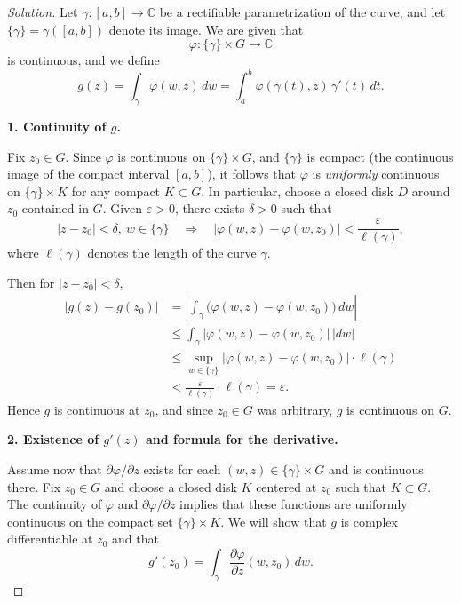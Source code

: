 \documentclass[12pt, a4paper]{report}
\theoremstyle{spaced}
\begin{document}
\begin{proof}[Solution]
	Let $\gamma : [a,b] \to \mathbb{C}$ be a rectifiable parametrization of the curve,
	and let $\{\gamma\} = \gamma([a,b])$ denote its image.
	We are given that
	\[
		\varphi : \{\gamma\} \times G \to \mathbb{C}
	\]
	is continuous, and we define
	\[
		g(z) = \int_{\gamma} \varphi(w,z)\,dw
		= \int_a^b \varphi(\gamma(t),z)\,\gamma'(t)\,dt.
	\]

	\medskip
	\noindent\textbf{1. Continuity of $g$.}

	Fix $z_0 \in G$.
	Since $\varphi$ is continuous on $\{\gamma\}\times G$, and $\{\gamma\}$ is compact
	(the continuous image of the compact interval $[a,b]$),
	it follows that $\varphi$ is \emph{uniformly} continuous on
	$\{\gamma\}\times K$ for any compact $K\subset G$.
	In particular, choose a closed disk $D$ around $z_0$ contained in $G$.
	Given $\varepsilon>0$, there exists $\delta>0$ such that
	\[
		|z-z_0|<\delta,\ w\in \{\gamma\}
		\quad\Longrightarrow\quad
		|\varphi(w,z)-\varphi(w,z_0)|<\frac{\varepsilon}{\ell(\gamma)},
	\]
	where $\ell(\gamma)$ denotes the length of the curve $\gamma$.

	Then for $|z-z_0|<\delta$,
	\[
		\begin{aligned}
			|g(z)-g(z_0)|
			 & = \left|\int_{\gamma} \bigl(\varphi(w,z)-\varphi(w,z_0)\bigr)\,dw\right|   \\
			 & \le \int_{\gamma} |\varphi(w,z)-\varphi(w,z_0)|\,|dw|                      \\
			 & \le \sup_{w\in\{\gamma\}} |\varphi(w,z)-\varphi(w,z_0)| \cdot \ell(\gamma) \\
			 & < \frac{\varepsilon}{\ell(\gamma)}\cdot \ell(\gamma)
			= \varepsilon.
		\end{aligned}
	\]
	Hence $g$ is continuous at $z_0$, and since $z_0\in G$ was arbitrary, $g$ is continuous on $G$.

	\medskip
	\noindent\textbf{2. Existence of $g'(z)$ and formula for the derivative.}

	Assume now that $\partial\varphi/\partial z$ exists for each $(w,z)\in \{\gamma\}\times G$
	and is continuous there.
	Fix $z_0\in G$ and choose a closed disk $K$ centered at $z_0$ such that $K\subset G$.
	The continuity of $\varphi$ and $\partial\varphi/\partial z$ implies that these functions
	are uniformly continuous on the compact set $\{\gamma\}\times K$.
	We will show that $g$ is complex differentiable at $z_0$ and that
	\[
		g'(z_0) = \int_{\gamma} \frac{\partial\varphi}{\partial z}(w,z_0)\,dw.
	\]


\end{proof}
\end{document}
